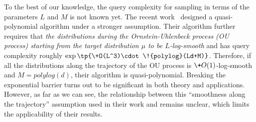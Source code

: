 \documentclass[11pt,a4paper]{article}
\begin{document}

 To the best of our knowledge, the query complexity for sampling in terms of the parameters $L$ and $M$ 
 is not known yet. The recent work~\cite{HZD+24} designed a quasi-polynomial algorithm under a stronger assumption. Their algorithm further requires that \emph{the distributions during the Ornstein-Uhlenbeck process (OU process) starting from the target distribution $\mu$ to be $L$-log-smooth} and has query complexity roughly $\exp\tp{\+O(L^3)\cdot \!{polylog}(Ld+M)}$. Therefore, if all the distributions along the trajectory of the OU process is $\+O(1)$-log-smooth and $M=\!{polylog}(d)$, their algorithm is quasi-polynomial. Breaking the exponential barrier turns out to be significant in both theory and applications. However, as far as we can see, the relationship between this ``smoothness along the trajectory'' assumption used in their work and  remains unclear, which limits the applicability of their results.

\end{document}
